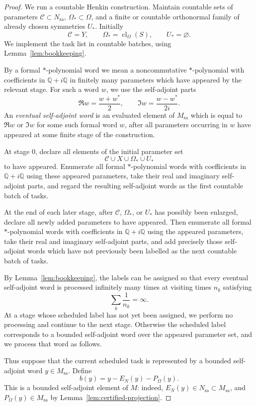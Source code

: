 \documentclass[11pt,letterpaper,reqno]{amsart}
\theoremstyle{definition}
\numberwithin{equation}{section}
\newcommand{\sa}{\mathrm{sa}}
\newcommand{\cl}{\operatorname{cl}}
\begin{document}
\begin{proof}
We run a countable Henkin construction.  Maintain countable sets of parameters $\mathcal C\subset N_{\sa}$, $\Omega_*\subset\Omega$, and a finite or countable orthonormal family of already chosen symmetries $U_*$.  Initially
\[
   \mathcal C=Y,
   \qquad
   \Omega_* = \cl_\Omega(S),
   \qquad
   U_* =\varnothing.
\]
We implement the task list in countable batches, using
Lemma~\ref{lem:bookkeeping}.  


By a formal \(*\)-polynomial word we mean a noncommutative \(*\)-polynomial
with coefficients in \(\mathbb Q+i\mathbb Q\) in finitely many parameters
which have appeared by the relevant stage.  For such a word \(w\), we use the
self-adjoint parts
\[
   \Re w=\frac{w+w^*}{2},
   \qquad
   \Im w=\frac{w-w^*}{2i}.
\]
An \emph{eventual self-adjoint word} is an evaluated element of \(M_{\sa}\)
which is equal to \(\Re w\) or \(\Im w\) for some such formal word \(w\), after
all parameters occurring in \(w\) have appeared at some finite stage of the
construction.


At stage \(0\), declare all elements of the
initial parameter set
\[
   \mathcal C\cup X\cup\Omega_*\cup U_*
\]
to have appeared.  Enumerate all formal \( * \)-polynomial words with
coefficients in \(\mathbb Q+i\mathbb Q\) using these appeared parameters,
take their real and imaginary self-adjoint parts, and regard the resulting
self-adjoint words as the first countable batch of tasks.

At the end of each later stage, after \(\mathcal C\), \(\Omega_*\), or
\(U_*\) has possibly been enlarged, declare all newly added parameters to
have appeared.  Then enumerate all formal \( * \)-polynomial words with
coefficients in \(\mathbb Q+i\mathbb Q\) using the appeared parameters, take
their real and imaginary self-adjoint parts, and add precisely those
self-adjoint words which have not previously been labelled as the next
countable batch of tasks.

By Lemma~\ref{lem:bookkeeping}, the labels can be assigned so that every
eventual self-adjoint word is processed infinitely many times at visiting
times \(n_k\) satisfying
\[
   \sum_k\frac1{n_k}=\infty .
\]
At a stage whose scheduled label has not yet been assigned, we perform no
processing and continue to the next stage.  Otherwise the scheduled label
corresponds to a bounded self-adjoint word over the appeared parameter set,
and we process that word as follows.

Thus suppose that the current scheduled task is represented by a bounded self-adjoint word \(y\in M_{\sa}\). Define
\[
   b(y)=y-E_N(y)-P_\Omega(y).
\]
This is a bounded self-adjoint element of \(M\): indeed,
\(E_N(y)\in N_{\sa}\subset M_{\sa}\), and
\(P_\Omega(y)\in M_{\sa}\) by Lemma~\ref{lem:certified-projection}.


\end{proof}
\end{document}
